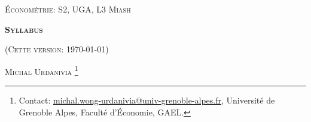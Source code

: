 


\usepackage{tikz}
\usepackage{enumitem}


\usepackage{fancyhdr}
\pagestyle{fancy}
\fancyhead{}
\fancyfoot{} 
\fancyfoot[C]{\small{\thepage}}
\renewcommand{\footrulewidth}{0pt}



 
\usetikzlibrary{positioning}
\usetikzlibrary{snakes}
\usetikzlibrary{calc}
\usetikzlibrary{arrows}
\usetikzlibrary{decorations.markings}
\usetikzlibrary{shapes.misc}
\usetikzlibrary{shapes}

\begin{titlepage}
\centering
	{\scshape\Large \textsc{Économétrie: S2, UGA, L3 Miash}\par}
	\vspace{1cm}
	{\Large\bfseries \textsc{Syllabus} \par}
    \vspace{1cm}   
	{(\textsc{Cette version: \today})\par}
	\vspace{1cm}
	{\large \textsc{Michal Urdanivia}
	\footnote{Contact:  
	\href{mailto:michal.wong-urdanivia@univ-grenoble-alpes.fr}{michal.wong-urdanivia@univ-grenoble-alpes.fr}, 
	 Université de Grenoble Alpes,  Faculté d'\'Economie, GAEL.}\par}
	
\end{titlepage}

